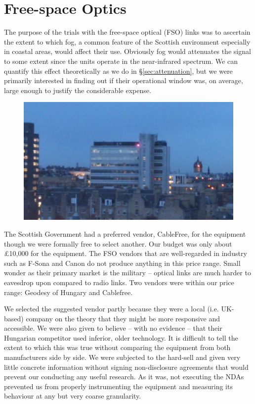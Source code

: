 
\section{Free-space Optics}
\label{sec:fso}

The purpose of the trials with the free-space optical (FSO) links was to
ascertain the extent to which fog, a common feature of the Scottish
environment especially in coastal areas, would affect their
use. Obviously fog would attenuates the signal to some extent since
the units operate in the near-infrared spectrum. We can quantify this
effect theoretically as we do in \S\ref{sec:attenuation},
but we were primarily interested in finding out if their operational
window was, on average, large enough to justify the considerable
expense.
\begin{figure}
  \includegraphics[width=\textwidth]{at-laser.jpg}
\end{figure}

The Scottish Government had a preferred vendor, CableFree, for the
equipment though we were formally free to select another. Our budget
was only about \pounds 10,000 for the equipment. The FSO vendors that
are well-regarded in industry such as F-Sona and Canon do not produce
anything in this price range. Small wonder as their primary market is
the military -- optical links are much harder to eavesdrop upon
compared to radio links. Two vendors were within our price range:
Geodesy of Hungary and Cablefree.

We selected the suggested vendor partly because they were a local
(i.e. UK-based) company on the theory that they might be more
responsive and accessible. We were also given to believe -- with no
evidence -- that their Hungarian competitor used inferior, older
technology. It is difficult to tell the extent to which this was
true without comparing the equipment from both manufacturers side by
side. We were subjected to the hard-sell and given very little
concrete information without signing non-disclosure agreements that
would prevent our conducting any useful research. As it was, not
executing the NDAs prevented us from properly instrumenting the
equipment and measuring its behaviour at any but very coarse
granularity.


